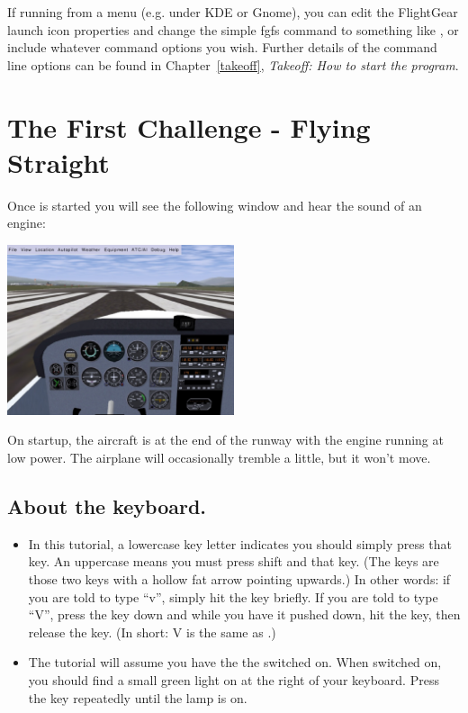 If running \FlightGear{} from a menu (e.g. under KDE or Gnome), you can edit the
FlightGear launch icon properties and change the simple  fgfs 
command to something like ,
or include whatever command options you wish. Further details of the command
line options can be found in Chapter~\ref{takeoff}, 
\textit{Takeoff: How to start the program}.

\section{The First Challenge - Flying Straight}
\label{sec:FlyingStraight}
    
Once \FlightGear{} is started you will see the following window and hear the 
sound of an engine:

\begin{center}
\includegraphics[width=0.5\textwidth]{img/tut_6}
\end{center}

On startup, the aircraft is at the end of the runway with the engine running 
at low power. The airplane will occasionally tremble a little, but it won't 
move.
    
\subsection*{About the keyboard.}
    
\begin{itemize}
	\item In this tutorial, a lowercase key letter indicates you should simply
  press that key. An uppercase means you must press shift and that key. 
  (The \textcolor{blue}{} keys are those two keys with 
  a hollow fat arrow pointing upwards.) In other words: if you are told to type
  ``v'', simply hit the  key briefly. 
   If you are told to type ``V'', 
  press the  key down and while you have it pushed down, hit the 
   key, then release the   key. (In short: V is the same as 
  .)
	\item The tutorial will assume you have the the  switched on. 
   When switched on, you should find a small green
  light on at the right of your keyboard. Press the 
  \textcolor{green}{}key repeatedly until the lamp is on.
\end{itemize}

